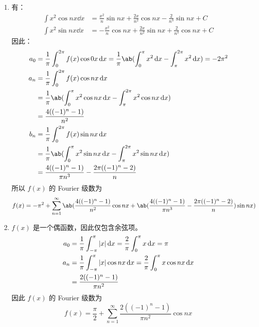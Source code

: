 \begin{problem}
\begin{solution}
\begin{enumerate}
            \item[\textbf{3)}] 有：
            $$
            \begin{aligned}
                \int x^2 \cos n x \dd{x} & = \frac{x^2}{n} \sin n x + \frac{2 x}{n^2} \cos n x - \frac{2}{n^3} \sin n x + C \\
                \int x^2 \sin n x \dd{x} & = -\frac{x^2}{n} \cos n x + \frac{2 x}{n^2} \sin n x + \frac{2}{n^3} \cos n x + C
            \end{aligned}
            $$
            因此：
            $$
            \begin{aligned}
                a_0 & = \frac{1}{\pi} \int_{0}^{2\pi} f(x) \cos 0x \dd{x} = \frac{1}{\pi} \ab(\int_{0}^{\pi} x^2 \dd{x} - \int_{\pi}^{2\pi} x^2 \dd{x}) = -2\pi^2 \\
                a_n & = \frac{1}{\pi} \int_{0}^{2\pi} f(x) \cos n x \dd{x} \\
                & = \frac{1}{\pi} \ab(\int_{0}^{\pi} x^2 \cos n x \dd{x} - \int_{\pi}^{2\pi} x^2 \cos n x \dd{x}) \\
                & = \frac{4 ((-1)^{n} - 1)}{n^2} \\
                b_n & = \frac{1}{\pi} \int_{0}^{2\pi} f(x) \sin n x \dd{x} \\
                & = \frac{1}{\pi} \ab(\int_{0}^{\pi} x^2 \sin n x \dd{x} - \int_{\pi}^{2\pi} x^2 \sin n x \dd{x}) \\
                & = \frac{4 ((-1)^{n} - 1)}{\pi n^3} - \frac{2\pi ((-1)^{n} - 2)}{n}
            \end{aligned}
            $$
            所以 $f(x)$ 的 Fourier 级数为
            $$
            f(x) = -\pi^2 + \sum_{n = 1}^{\infty} \ab(\frac{4 ((-1)^{n} - 1)}{n^2} \cos n x + \ab(\frac{4 ((-1)^{n} - 1)}{\pi n^3} - \frac{2\pi ((-1)^{n} - 2)}{n}) \sin n x)
            $$

            \item[\textbf{4)}] $f(x)$ 是一个偶函数，因此仅包含余弦项。
            $$
            \begin{aligned}
                a_0 & = \frac{1}{\pi} \int_{-\pi}^{\pi} \abs{x} \dd{x} = \frac{2}{\pi} \int_0^{\pi} x \dd{x} = \pi \\
                a_n & = \frac{1}{\pi} \int_{-\pi}^{\pi} \abs{x} \cos n x \dd{x} = \frac{2}{\pi} \int_0^{\pi} x \cos n x \dd{x} \\
                & = \frac{2 ((-1)^{n} - 1)}{\pi n^2}
            \end{aligned}
            $$
            因此 $f(x)$ 的 Fourier 级数为
            $$
            f(x) = \frac{\pi}{2} + \sum_{n = 1}^{\infty} \frac{2 ((-1)^{n} - 1)}{\pi n^2} \cos n x
            $$
        \end{enumerate}
    \end{solution}
\end{problem}

